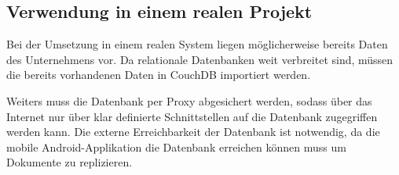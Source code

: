 \subsection{Verwendung in einem realen Projekt}

Bei der Umsetzung in einem realen System liegen möglicherweise bereits Daten des
 	Unternehmens vor. Da relationale Datenbanken weit verbreitet sind, müssen die
	bereits vorhandenen Daten in CouchDB importiert werden.

Weiters muss die Datenbank per Proxy abgesichert werden, sodass über das Internet
	nur über klar definierte Schnittstellen auf die Datenbank zugegriffen werden
	kann. Die externe Erreichbarkeit der Datenbank ist notwendig, da die mobile
	Android-Applikation die Datenbank erreichen können muss um Dokumente zu replizieren.